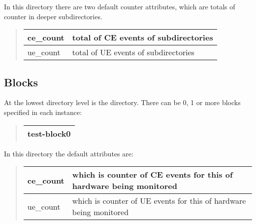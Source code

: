 \documentclass[a4paper,8pt,english]{sphinxmanual}
\begin{document}
In this directory there are two default counter attributes, which are totals of
counter in deeper subdirectories.
\begin{quote}

\begin{tabulary}{\linewidth}{|L|L|}
\hline

ce\_count
 & 
total of CE events of subdirectories
\\
\hline
ue\_count
 & 
total of UE events of subdirectories
\\
\hline\end{tabulary}

\end{quote}


\subsection{Blocks}
\label{admin-guide/ras:blocks}
At the lowest directory level is the  directory. There can be 0, 1
or more blocks specified in each instance:
\begin{quote}

\begin{tabulary}{\linewidth}{|L|}
\hline

test-block0
\\
\hline\end{tabulary}

\end{quote}

In this directory the default attributes are:
\begin{quote}

\begin{tabulary}{\linewidth}{|L|L|}
\hline

ce\_count
 & 
which is counter of CE events for this 
of hardware being monitored
\\
\hline
ue\_count
 & 
which is counter of UE events for this 
of hardware being monitored
\\
\hline\end{tabulary}

\end{quote}
\end{document}

